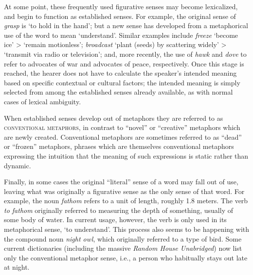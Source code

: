 At some point, these frequently used figurative senses may become lexicalized, and begin to function as established senses. For example, the original sense of \textit{grasp} is ‘to hold in the hand’; but a new sense has developed from a metaphorical use of the word to mean ‘understand’. Similar examples include \textit{freeze} ‘become ice’ > ‘remain motionless’; \textit{broadcast} ‘plant (seeds) by scattering widely’ > ‘transmit via radio or television’; and, more recently, the use of \textit{hawk} and \textit{dove} to refer to advocates of war and advocates of peace, respectively. Once this stage is reached, the hearer does not have to calculate the speaker’s intended meaning based on specific contextual or cultural factors; the intended meaning is simply selected from among the established senses already available, as with normal cases of lexical ambiguity.



When established senses develop out of metaphors they are referred to as \textsc{conventional metaphors}, in contrast to “novel” or “creative” metaphors which are newly created. Conventional metaphors are sometimes referred to as “dead” or “frozen” metaphors, phrases which are themselves conventional metaphors expressing the intuition that the meaning of such expressions is static rather than dynamic.



Finally, in some cases the original “literal” sense of a word may fall out of use, leaving what was originally a figurative sense as the only sense of that word. For example, the noun \textit{fathom} refers to a unit of length, roughly 1.8 meters. The verb \textit{to fathom} originally referred to measuring the depth of something, usually of some body of water. In current usage, however, the verb is only used in its metaphorical sense, ‘to understand’. This process also seems to be happening with the compound noun \textit{night owl}, which originally referred to a type of bird. Some current dictionaries (including the massive \textit{Random House Unabridged}) now list only the conventional metaphor sense, i.e., a person who habitually stays out late at night.



